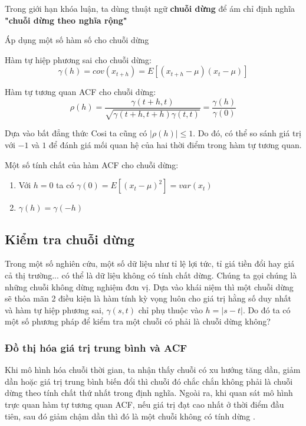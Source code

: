  Trong giới hạn khóa luận, ta dùng thuật ngữ \textbf{chuỗi dừng} để ám chỉ định nghĩa \textbf{"chuỗi dừng theo nghĩa rộng"}

Áp dụng một số hàm số cho chuỗi dừng

\begin{defi}
Hàm tự hiệp phương sai cho chuỗi dừng:
	\begin{equation}
		\gamma(h) = cov(x_{t+h}) = E[(x_{t+h}-\mu)(x_t-\mu)]
	\end{equation}
\end{defi}

\begin{defi}
Hàm tự tương quan ACF cho chuỗi dừng:
\begin{equation}
	\rho(h) = \frac{\gamma(t+h,t)}{\sqrt{\gamma(t+h,t+h)\gamma(t,t)}}=\frac{\gamma(h)}{\gamma(0)}
\end{equation}
\end{defi}
Dựa vào bất đẳng thức Cosi ta cũng có $|\rho(h)| \leq 1$. Do đó, có thể so sánh giá trị với $-1$ và $1$ để đánh giá mối quan hệ của hai thời điểm trong hàm tự tương quan.

Một số tính chất của hàm ACF cho chuỗi dừng:
\begin{enumerate}
	\item Với $h=0$ ta có $\gamma(0) = E[(x_t-\mu)^2] = var(x_t)$ 
	\item $\gamma(h)=\gamma(-h)$
\end{enumerate}
\subsection{Kiểm tra chuỗi dừng}\label{1.2.2}
Trong một số nghiên cứu, một số dữ liệu như tỉ lệ lợi tức, tỉ giá tiền đổi hay giá cả thị trường... có thể là dữ liệu không có tính chất dừng. Chúng ta gọi chúng là những chuỗi không dừng nghiệm đơn vị.
Dựa vào khái niệm thì một chuỗi dừng sẽ thỏa mãn 2 điều kiện là hàm tính kỳ vọng luôn cho giá trị hằng số duy nhất và hàm tự hiệp phương sai, $\gamma(s,t)$ chỉ phụ thuộc vào $h=|s-t|$. Do đó ta có một số phương pháp để kiểm tra một chuỗi có phải là chuỗi dừng không?
\subsubsection{Đồ thị hóa giá trị trung bình và ACF}
Khi mô hình hóa chuỗi thời gian, ta nhận thấy chuỗi có xu hướng tăng dần, giảm dần hoặc giá trị trung bình biến đổi thì chuỗi đó chắc chắn không phải là chuỗi dừng theo tính chất thứ nhất trong định nghĩa.
Ngoài ra, khi quan sát mô hình trực quan hàm tự tương quan ACF, nếu giá trị đạt cao nhất ở thời điểm đầu tiên, sau đó giảm chậm dần thì đó là một chuỗi không có tính dừng \citep{bow79}.
